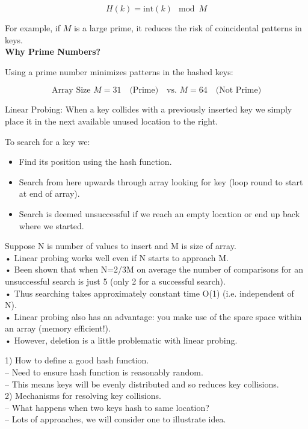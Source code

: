 \documentclass[a4paper,12pt]{article}
\begin{document}
\[
H(k) = \text{int}(k) \mod M
\]

For example, if \(M\) is a large prime, it reduces the risk of coincidental patterns in keys.\\

\textbf{Why Prime Numbers?}

Using a prime number minimizes patterns in the hashed keys:

\[
\text{Array Size } M = 31 \quad \text{(Prime)} \quad \text{vs. } M = 64 \quad \text{(Not Prime)}
\]

Linear Probing: When a key collides with a previously inserted key we simply place it in the next available unused location to the right.

To search for a key we:
\begin{itemize}
    \item Find its position using the hash function.
    \item Search from here upwards through array looking for key (loop round to start at end of array).
    \item Search is deemed unsuccessful if we reach an empty location or end up back where we started.
\end{itemize}

Suppose N is number of values to insert and M is size of
array.\\
• Linear probing works well even if N starts to approach M.\\
• Been shown that when N=2/3M on average the number of
comparisons for an unsuccessful search is just 5 (only 2 for
a successful search).\\
• Thus searching takes approximately constant time O(1)
(i.e. independent of N).\\
• Linear probing also has an advantage: you make use of the
spare space within an array (memory efficient!).\\
• However, deletion is a little problematic with linear probing.

1) How to define a good hash function.\\
– Need to ensure hash function is reasonably random.\\
– This means keys will be evenly distributed and so
reduces key collisions.\\
2) Mechanisms for resolving key collisions.\\
– What happens when two keys hash to same location?\\
– Lots of approaches, we will consider one to illustrate
idea.
\end{document}
